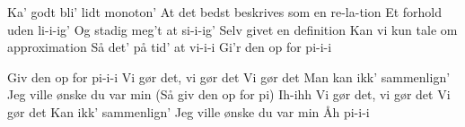 \documentclass[a4paper,11pt]{article}
\begin{document}
\begin{song}
 Ka' godt bli' lidt monoton'
At det bedst beskrives som en re-la-tion
Et forhold uden li-i-ig'
Og stadig meg't at si-i-ig'
Selv givet en definition 
Kan vi kun tale om approximation
Så det' på tid' at vi-i-i
Gi'r den op for pi-i-i


 Giv den op for pi-i-i
Vi gør det, vi gør det 
Vi gør det
Man kan ikk' sammenlign' 
Jeg ville ønske du var min
(Så giv den op for pi)
Ih-ihh
Vi gør det, vi gør det 
Vi gør det
Kan ikk' sammenlign'
Jeg ville ønske du var min
Åh pi-i-i





\end{song}
\end{document}
